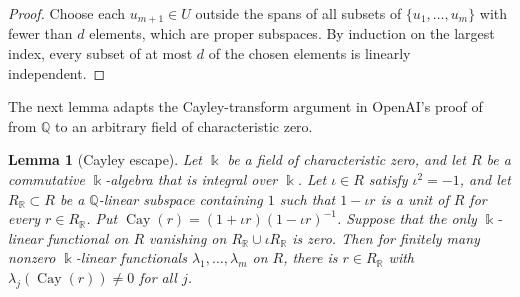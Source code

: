 \documentclass[10pt]{article}
\newtheorem{lem}[thm]{Lemma}
\theoremstyle{remark}
\newcommand{\R}{\mathbb R}
\newcommand{\Q}{\mathbb Q}
\DeclareMathOperator{\Cay}{Cay}
\begin{document}
\begin{proof}
Choose each $u_{m+1}\in U$ outside the spans of all subsets of $\{u_1,\ldots,u_m\}$ with fewer than $d$ elements, which are proper subspaces. By induction on the largest index, every subset of at most $d$ of the chosen elements is linearly independent.
\end{proof}

The next lemma adapts the Cayley-transform argument in OpenAI's proof of~\cite[Lemma~3.4]{OAI} from $\Q$ to an arbitrary field of characteristic zero.

\begin{lem}[Cayley escape]\label{lem:cayley}
Let $\Bbbk$ be a field of characteristic zero, and let $R$ be a commutative $\Bbbk$-algebra that is integral over $\Bbbk$. Let $\iota\in R$ satisfy $\iota^2=-1$, and let $R_\R\subset R$ be a $\Q$-linear subspace containing $1$ such that $1-\iota r$ is a unit of $R$ for every $r\in R_\R$. Put $\Cay(r)=(1+\iota r)(1-\iota r)^{-1}$. Suppose that the only $\Bbbk$-linear functional on $R$ vanishing on $R_\R\cup\iota R_\R$ is zero. Then for finitely many nonzero $\Bbbk$-linear functionals $\lambda_1,\ldots,\lambda_m$ on $R$, there is $r\in R_\R$ with $\lambda_j(\Cay(r))\ne0$ for all $j$.
\end{lem}
\end{document}
